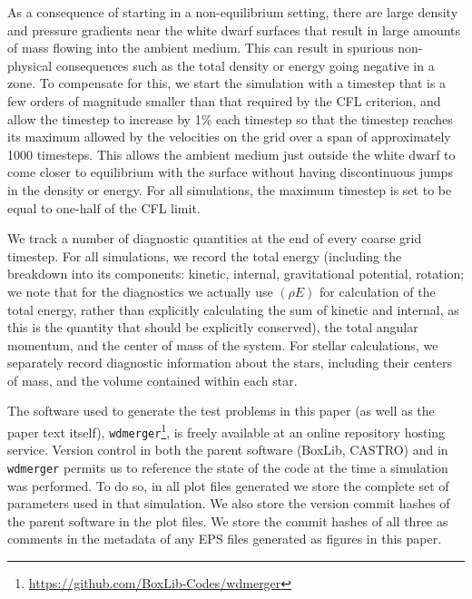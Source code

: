 \documentclass{emulateapj}
\begin{document}
As a consequence of starting in a non-equilibrium setting, there are 
large density and pressure gradients near the white dwarf surfaces
that result in large amounts of mass flowing into the ambient
medium. This can result in spurious non-physical consequences such as 
the total density or energy going negative in a zone. To compensate 
for this, we start the simulation with a timestep that is a few orders 
of magnitude smaller than that required by the CFL criterion, and allow
the timestep to increase by 1\% each timestep so that the timestep reaches 
its maximum allowed by the velocities on the grid over a span of approximately 
1000 timesteps. This allows the ambient medium just outside the white dwarf
to come closer to equilibrium with the surface without having 
discontinuous jumps in the density or energy. For all simulations, 
the maximum timestep is set to be equal to one-half of the CFL limit.

We track a number of diagnostic quantities at the end of every coarse grid timestep. 
For all simulations, we record the total energy (including the breakdown into
its components: kinetic, internal, gravitational potential, rotation; we note
that for the diagnostics we actually use $(\rho E)$ for calculation of the total energy,
rather than explicitly calculating the sum of kinetic and internal, as this is
the quantity that should be explicitly conserved), 
the total angular momentum, and the center of mass of the system. 
For stellar calculations, we separately record diagnostic 
information about the stars, including their centers of mass, 
and the volume contained within each star.

The software used to generate the test problems in this paper
(as well as the paper text itself),
\texttt{wdmerger}\footnote{\url{https://github.com/BoxLib-Codes/wdmerger}},
is freely available at an online repository hosting service.
Version control in both the parent software (BoxLib, CASTRO) and in \texttt{wdmerger}
permits us to reference the state of the code at the time a simulation
was performed. To do so, in all plot files generated we store
the complete set of parameters used in that simulation. We also store the 
version commit hashes of the parent software in the plot files.
We store the commit hashes of all three as comments in the metadata of 
any EPS files generated as figures in this paper.

\end{document}
